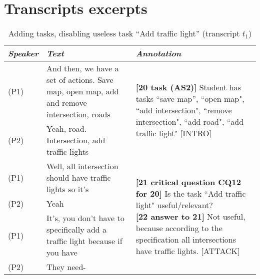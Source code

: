 \section{Transcripts excerpts}
\label{sect:transcripts:excerpts}

\begin{table}[!htbp]
\centering
\begin{tabular}{|p{17mm}|p{63mm}|p{70mm}|}
\hline
\textit{Speaker} & \textit{Text} & \textit{Annotation}\\
\hline
(P1) & And then, we have a set of actions. Save map, open map, add and remove intersection, roads & \multirow{2}{70mm}{\textbf{[20 task (AS2)]} Student has tasks ``save map'', ``open map", ``add intersection", ``remove intersection", ``add road", ``add traffic light" \textsf{[INTRO]}}\\
\cline{1-2}
(P2) & Yeah, road. Intersection, add traffic lights &\\
\hline
(P1) & Well, all intersection should have traffic lights so it's & \multirow{4}{70mm}{\textbf{[21 critical question CQ12 for 20]} Is the task ``Add traffic light" useful/relevant?\newline
\textbf{[22 answer to 21]} Not useful, because according to the specification all intersections have traffic lights. \textsf{[ATTACK]}}\\
\cline{1-2}
(P2) & Yeah &\\
\cline{1-2}
(P1) & It's, you don't have to specifically add a traffic light because if you have &\\
\cline{1-2}
(P2)	& They need-&\\
\hline
\end{tabular}
\caption{Adding tasks, disabling useless task ``Add traffic light'' (transcript $t_1$)}
\label{table:transcripts:traffic-light}


\end{table}
